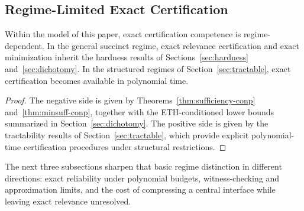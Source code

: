 \subsection{Regime-Limited Exact Certification}

\begin{proposition}
\label{prop:competence-by-regime}
Within the model of this paper, exact certification competence is regime-dependent. In the general succinct regime, exact relevance certification and exact minimization inherit the hardness results of Sections~\ref{sec:hardness} and~\ref{sec:dichotomy}. In the structured regimes of Section~\ref{sec:tractable}, exact certification becomes available in polynomial time.
\end{proposition}


\begin{proof}
The negative side is given by Theorems~\ref{thm:sufficiency-conp} and~\ref{thm:minsuff-conp}, together with the ETH-conditioned lower bounds summarized in Section~\ref{sec:dichotomy}. The positive side is given by the tractability results of Section~\ref{sec:tractable}, which provide explicit polynomial-time certification procedures under structural restrictions.
\end{proof}

The next three subsections sharpen that basic regime distinction in different directions: exact reliability under polynomial budgets, witness-checking and approximation limits, and the cost of compressing a central interface while leaving exact relevance unresolved.
